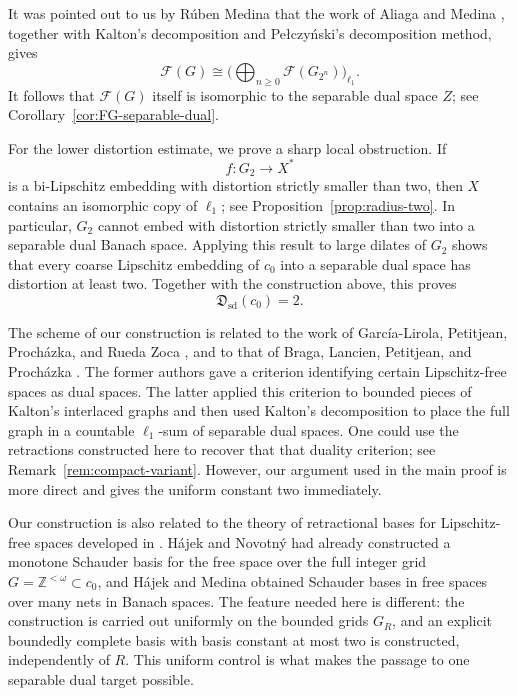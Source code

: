 \documentclass[11pt]{amsart}
\theoremstyle{definition}
\newcommand{\F}{\mathcal F}
\begin{document}
 It was pointed out to us by R\'uben Medina that the work of Aliaga and Medina \cite{AliagaMedina2026}, together with Kalton's decomposition and Pe{\l}czy\'nski's decomposition method, gives \[ \F(G) \cong \Big( \bigoplus_{n\geq0}\F(G_{2^n}) \Big)_{\ell_1}. \] 
It follows that $\F(G)$ itself is isomorphic to the separable dual space $Z$; see Corollary~\ref{cor:FG-separable-dual}. 



For the lower distortion estimate, we prove a sharp local obstruction. If \[ f:G_2\longrightarrow X^* \] is a bi-Lipschitz embedding with distortion strictly smaller than two, then $X$ contains an isomorphic copy of $\ell_1$; see Proposition~\ref{prop:radius-two}. In particular, $G_2$ cannot embed with distortion strictly smaller than two into a separable dual Banach space. Applying this result to large dilates of $G_2$ shows that every coarse Lipschitz embedding of $c_0$ into a separable dual space has distortion at least two. Together with the construction above, this proves \[ \mathfrak D_{\mathrm{sd}}(c_0)=2. \] 

The scheme of our construction is related to the work of Garc\'ia-Lirola, Petitjean, Proch\'azka, and Rueda Zoca \cite{GLPPRZ}, and to that of Braga, Lancien, Petitjean, and Proch\'azka \cite{BLPP}. The former authors gave a criterion identifying certain Lipschitz-free spaces as dual spaces. The latter applied this criterion to bounded pieces of Kalton's interlaced graphs and then used Kalton's decomposition to place the full graph in a countable $\ell_1$-sum of separable dual spaces. One could use the retractions constructed here to recover that that duality criterion; see Remark~\ref{rem:compact-variant}. However, our argument used in the main proof is more direct and gives the uniform constant two immediately. 

Our construction is also related to the theory of retractional bases for Lipschitz-free spaces developed in \cite{HN,HM}. H\'ajek and Novotn\'y \cite{HN} had already constructed a monotone Schauder basis for the free space over the full integer grid $G=\mathbb Z^{<\omega}\subset c_0$, and H\'ajek and Medina \cite{HM} obtained Schauder bases in free spaces over many nets in Banach spaces. The feature needed here is different: the
construction is carried out uniformly on the bounded grids $G_R$,
and an explicit boundedly complete
basis with basis constant at most two is constructed, independently of $R$.  This
uniform control is what makes the passage to one separable dual
target possible.
\end{document}
